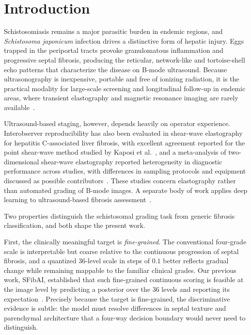 \section{Introduction}
\label{sec:intro}

Schistosomiasis remains a major parasitic burden in endemic regions, and
\emph{Schistosoma japonicum} infection drives a distinctive form of hepatic
injury. Eggs trapped in the periportal tracts provoke granulomatous
inflammation and progressive septal fibrosis, producing the reticular,
network-like and tortoise-shell echo patterns that characterize the disease on
B-mode ultrasound. Because ultrasonography is inexpensive, portable and free of
ionizing radiation, it is the practical modality for large-scale screening and
longitudinal follow-up in endemic areas, where transient elastography and
magnetic resonance imaging are rarely
available~\cite{schistoelasto2018,schistopocus2024}.

Ultrasound-based staging, however, depends heavily on operator experience.
Interobserver reproducibility has also been evaluated in shear-wave
elastography for hepatitis C-associated liver fibrosis, with excellent
agreement reported for the point shear-wave method studied by
Kaposi et al.~\cite{interobserver2019}, and a meta-analysis of
two-dimensional shear-wave elastography reported heterogeneity in diagnostic
performance across studies, with differences in sampling protocols and
equipment discussed as possible contributors~\cite{swe2018staging}.
These studies concern elastography rather than automated grading of B-mode
images. A separate body of work applies deep learning to ultrasound-based
fibrosis assessment~\cite{usfibrosisgan2022,microflow2023,hfus2025,liverspleen2025}.

Two properties distinguish the schistosomal grading task from generic fibrosis
classification, and both shape the present work.

First, the clinically meaningful target is \emph{fine-grained}. The
conventional four-grade scale is interpretable but coarse relative to the
continuous progression of septal fibrosis, and a quantized 36-level scale in
steps of $0.1$ better reflects gradual change while remaining mappable to the
familiar clinical grades. Our previous work, SFibAI, established that such
fine-grained continuous scoring is feasible at the image level by predicting a
posterior over the 36 levels and reporting its
expectation~\cite{xu2026sfibai}. Precisely because the target is fine-grained,
the discriminative evidence is subtle: the model must resolve differences in
septal texture and parenchymal architecture that a four-way decision boundary
would never need to distinguish.

